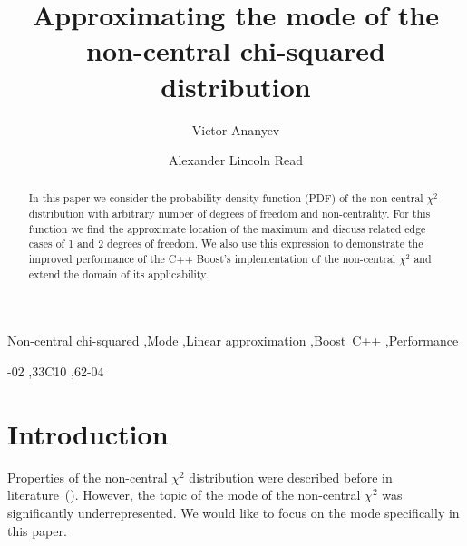 \documentclass[final,5p,twocolumn,preprint,nopreprintline,times,authoryear]{elsarticle}
\begin{document}
\begin{frontmatter}

\title{Approximating the mode of the non-central chi-squared distribution}

\author[uio]{Victor Ananyev}
\author[uio]{Alexander Lincoln Read}

\begin{abstract}
In this paper we consider the probability density function (PDF) of the non-central $\chi^2$ distribution with arbitrary number of degrees of freedom and non-centrality. For this function we find the approximate location of the maximum and discuss related edge cases of 1 and 2 degrees of freedom. We also use this expression to demonstrate the improved performance of the C++ Boost's implementation of the non-central $\chi^2$ and extend the domain of its applicability.
\end{abstract}


\begin{keyword}
Non-central chi-squared \sep Mode \sep Linear approximation \sep Boost~C++ \sep Performance

-02 \sep 33C10 \sep 62-04
\end{keyword}

\end{frontmatter}


\section{Introduction}\label{introduction}
Properties of the non-central $\chi^2$ distribution were described before in literature~(\cite{Andrs2008, hogan2013, Saulis2001}). However, the topic of the mode of the non-central $\chi^2$ was significantly underrepresented. We would like to focus on the mode specifically in this paper.
\end{document}
